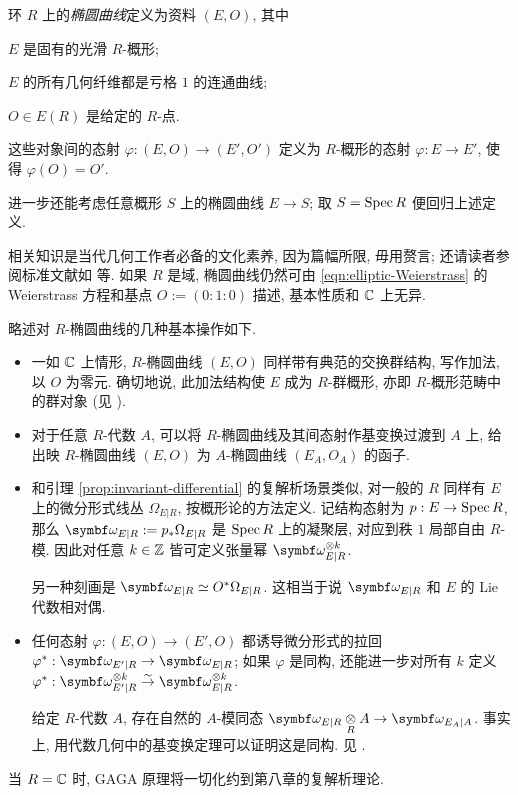 \begin{definition}
	环 $R$ 上的\emph{椭圆曲线}定义为资料 $(E, O)$, 其中
	\begin{compactitem}
		\item $E$ 是固有的光滑 $R$-概形;
		\item $E$ 的所有几何纤维都是亏格 $1$ 的连通曲线;
		\item $O \in E(R)$ 是给定的 $R$-点.
	\end{compactitem}
	这些对象间的态射 $\varphi: (E, O) \to (E', O')$ 定义为 $R$-概形的态射 $\varphi: E \to E'$, 使得 $\varphi(O) = O'$.
\end{definition}
进一步还能考虑任意概形 $S$ 上的椭圆曲线 $E \to S$; 取 $S = \operatorname{Spec} R$ 便回归上述定义.

相关知识是当代几何工作者必备的文化素养, 因为篇幅所限, 毋用赘言; 还请读者参阅标准文献如 \cite{KM85, Sil09} 等. 如果 $R$ 是域, 椭圆曲线仍然可由 \eqref{eqn:elliptic-Weierstrass} 的 Weierstrass 方程和基点 $O := (0:1:0)$ 描述, 基本性质和 $\mathbb{C}$ 上无异.

略述对 $R$-椭圆曲线的几种基本操作如下.
\begin{itemize}
	\item 一如 $\mathbb{C}$ 上情形, $R$-椭圆曲线 $(E, O)$ 同样带有典范的交换群结构, 写作加法, 以 $O$ 为零元. 确切地说, 此加法结构使 $E$ 成为 $R$-群概形, 亦即 $R$-概形范畴中的群对象 (见 \cite[\S 4.11]{Li1}).
	
	\item 对于任意 $R$-代数 $A$, 可以将 $R$-椭圆曲线及其间态射作基变换过渡到 $A$ 上, 给出映 $R$-椭圆曲线 $(E, O)$ 为 $A$-椭圆曲线 $(E_A, O_A)$ 的函子.
	
	\item 和引理 \ref{prop:invariant-differential} 的复解析场景类似, 对一般的 $R$ 同样有 $E$ 上的微分形式线丛 $\Omega_{E|R}$, 按概形论的方法定义. 记结构态射为 $p: E \to \operatorname{Spec} R$, 那么 $\bomega_{E|R} := p_* \Omega_{E|R}$ 是 $\operatorname{Spec} R$ 上的凝聚层, 对应到秩 $1$ 局部自由 $R$-模. 因此对任意 $k \in \mathbb{Z}$ 皆可定义张量幂 $\bomega_{E|R}^{\otimes k}$.
	
	另一种刻画是 $\bomega_{E|R} \simeq O^* \Omega_{E|R}$. 这相当于说 $\bomega_{E|R}$ 和 $E$ 的 Lie 代数相对偶.
	\item 任何态射 $\varphi: (E, O) \to (E', O)$ 都诱导微分形式的拉回 $\varphi^*: \bomega_{E'|R} \to \bomega_{E|R}$; 如果 $\varphi$ 是同构, 还能进一步对所有 $k$ 定义 $\varphi^*: \bomega_{E'|R}^{\otimes k} \rightiso \bomega_{E|R}^{\otimes k}$.
	
	给定 $R$-代数 $A$, 存在自然的 $A$-模同态 $\bomega_{E|R} \dotimes{R} A \to \bomega_{E_A|A}$. 事实上, 用代数几何中的基变换定理可以证明这是同构. 见 \cite[II, 1.6]{DR73}.
\end{itemize}
当 $R = \mathbb{C}$ 时, GAGA 原理将一切化约到第八章的复解析理论.

